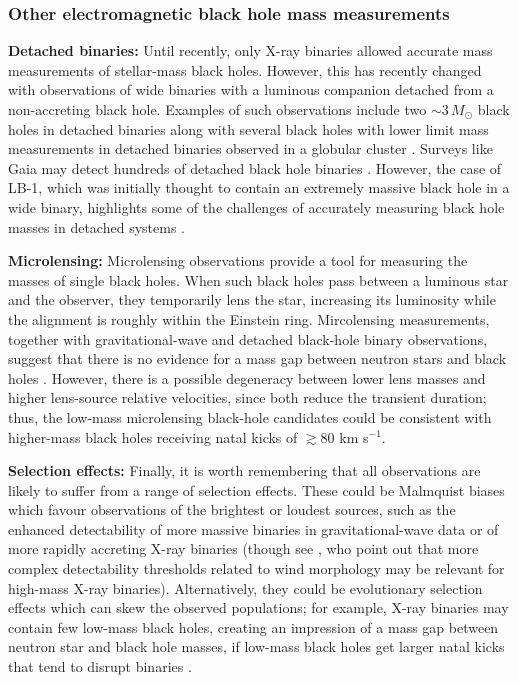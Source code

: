 \documentclass[review]{elsarticle}
\begin{document}
\subsubsection{Other electromagnetic black hole mass measurements} \label{sec:lensing}

\textbf{Detached binaries:} Until recently, only X-ray binaries allowed accurate mass measurements of stellar-mass black holes.  However, this has recently changed with observations of wide binaries with a luminous companion detached from a non-accreting black hole.  Examples of such observations include two $\sim 3\, M_\odot$ black holes in detached binaries \citep{Thompson:2019,Jayasinghe:2021} along with several black holes with lower limit mass measurements in detached binaries observed in a globular cluster \citep{Giesers:2019}.  Surveys like Gaia may detect hundreds of detached black hole binaries \citep[e.g.,][]{Chawla:2021}.  However, the case of LB-1, which was initially thought to contain an extremely massive black hole in a wide binary, highlights some of the challenges of accurately measuring black hole masses in detached systems \citep{Liu:2019,Eldridge:2020,AbdulMassih:2020,Shenar:2020}.   

\textbf{Microlensing:} Microlensing observations provide a tool for measuring the masses of single black holes.  When such black holes pass between a luminous star and the observer, they temporarily lens the star, increasing its luminosity while the alignment is roughly within the Einstein ring.  Mircolensing measurements, together with gravitational-wave and detached black-hole binary observations, suggest that there is no evidence for a mass gap between neutron stars and black holes \citep{WyrzykowskiMandel:2019, Mroz:2021}.  However, there is a possible degeneracy between lower lens masses and higher lens-source relative velocities, since both reduce the transient duration; thus, the low-mass microlensing black-hole candidates could be consistent with higher-mass black holes receiving natal kicks of $\gtrsim 80$ km s$^{-1}$.

\textbf{Selection effects:} Finally, it is worth remembering that all observations are likely to suffer from a range of selection effects.  These could be Malmquist biases which favour observations of the brightest or loudest sources, such as the enhanced detectability of more massive binaries in gravitational-wave data or of more rapidly accreting X-ray binaries (though see \citet{HiraiMandel:2021}, who point out that more complex detectability thresholds related to wind morphology may be relevant for high-mass X-ray binaries).  Alternatively, they could be evolutionary selection effects which can skew the observed populations; for example, X-ray binaries may contain few low-mass black holes, creating an impression of a mass gap between neutron star and black hole masses, if low-mass black holes get larger natal kicks that tend to disrupt binaries \citep{Mandel:2020}.
\end{document}
